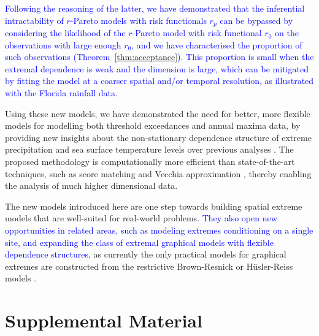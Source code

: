 \documentclass[12pt]{article}
\newcommand{\PZ}{\textcolor{blue}}
\begin{document}
\PZ{Following the reasoning of the latter, we have demonstrated that the inferential intractability of $r$-Pareto models with risk functionals $r_p$ can be bypassed by considering the likelihood of the $r$-Pareto model with risk functional $r_0$ on the observations with large enough $r_0$, and we have characterised the proportion of such observations (Theorem~\ref{thm:acceptance}). This proportion is small when the extremal dependence is weak and the dimension is large, which can be mitigated by fitting the model at a coarser spatial and/or temporal resolution, as illustrated with the Florida rainfall data.}


Using these new models, we have demonstrated
the need for better, more flexible models for
modelling both threshold exceedances and annual maxima data, 
by providing new insights about the non-stationary dependence structure of extreme precipitation and sea surface temperature levels over previous analyses \citep{deFondeville.Davison:2018,Huser.Zhong:2023}. 
The proposed methodology is 
computationally more efficient than state-of-the-art techniques, such as score matching \citep{deFondeville.Davison:2018} and Vecchia approximation \citep{Huser.Zhong:2023}, 
thereby enabling the analysis of much higher dimensional data. 

The new models introduced here are one step towards building spatial extreme models that are well-suited for real-world problems.
\PZ{They also open new opportunities in related areas, such as modeling extremes conditioning on a single site, and expanding the class of extremal graphical models with flexible dependence structures}, as currently the only practical models for graphical extremes are constructed from the restrictive Brown-Resnick or H\"usler-Reiss models \citep{Engelke.Hitz:2020,Hentschel.Engelke.Segers:2024,Wan.Zhou:2023}. 


\section*{Supplemental Material}
\end{document}
